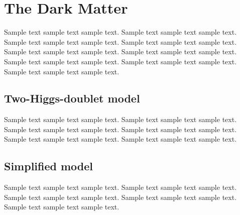 \chapter{The Dark Matter}

Sample text sample text sample text. Sample text sample text sample text.
Sample text sample text sample text. Sample text sample text sample text.
Sample text sample text sample text. Sample text sample text sample text.
Sample text sample text sample text. Sample text sample text sample text.
Sample text sample text sample text. \cite{MonoHiggs-Berlin2014}

\section{Two-Higgs-doublet model}
Sample text sample text sample text. Sample text sample text sample text.
Sample text sample text sample text. Sample text sample text sample text.
Sample text sample text sample text. Sample text sample text sample text.

\section{Simplified model}
Sample text sample text sample text. Sample text sample text sample text.
Sample text sample text sample text. Sample text sample text sample text.
Sample text sample text sample text. \cite{SimplifiedModels-Alves2012}
